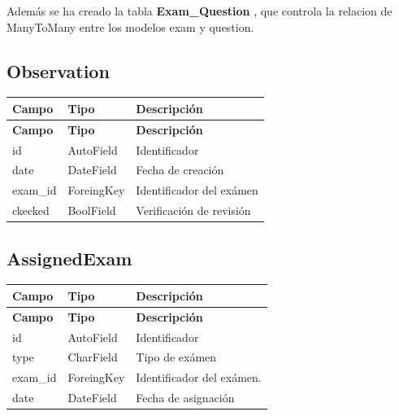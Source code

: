 \documentclass[a4paper,12pt]{article}
\begin{document}
 Además se ha creado la tabla \textbf{Exam\_Question} , que controla la relacion de ManyToMany entre los modelos exam y question.
\newpage
\subsection{Observation}
\begin{longtable}{| p{3cm} | p{3cm}|p{10cm}|}
	\hline
	\textbf{Campo} & \textbf{Tipo} & \textbf{Descripción} \\
	\hline
	\endfirsthead
	\hline
	\textbf{Campo} & \textbf{Tipo} & \textbf{Descripción} \\
	\hline
	\endhead
	\hline
	\endfoot
	\hline
	\endlastfoot
	
	id & AutoField & Identificador \\
	\hline
	date & DateField & Fecha de creación \\
	\hline
	exam\_id & ForeingKey & Identificador del exámen\\
	\hline
	ckecked & BoolField & Verificación de revisión\\

	\hline
\end{longtable}



\subsection{AssignedExam}
\begin{longtable}{| p{3cm} | p{3cm}|p{10cm}|}
	\hline
	\textbf{Campo} & \textbf{Tipo} & \textbf{Descripción} \\
	\hline
	\endfirsthead
	\hline
	\textbf{Campo} & \textbf{Tipo} & \textbf{Descripción} \\
	\hline
	\endhead
	\hline
	\endfoot
	\hline
	\endlastfoot
	
	id & AutoField & Identificador  \\
	\hline
	type & CharField & Tipo de exámen  \\
	\hline
	exam\_id & ForeingKey & Identificador del exámen. \\
	\hline
	date & DateField & Fecha de asignación\\
	
	\hline
\end{longtable}
\end{document}
